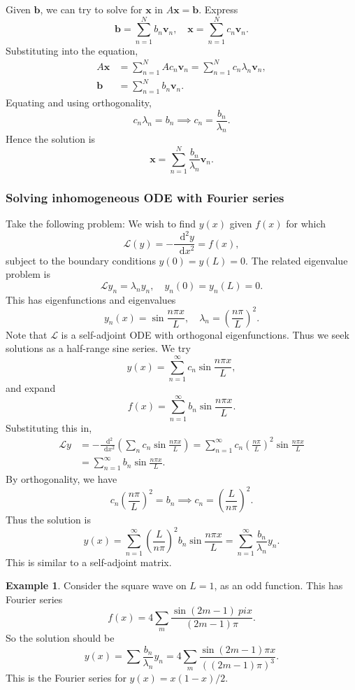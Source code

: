 \documentclass[12pt]{article}
\newcommand{\diff}{\mathop{}\!\mathrm{d}}
\newcommand{\Diff}[1]{\mathop{}\!\mathrm{d}^{#1}}
\theoremstyle{definition}
\newtheorem{example}{Example}[section]
\theoremstyle{remark}
\begin{document}
Given $\mathbf{b}$, we can try to solve for $\mathbf{x}$ in $A \mathbf{x} = \mathbf{b}$. Express 
\[
	\mathbf{b} = \sum_{n = 1}^{N} b_n \mathbf{v}_n, \quad \mathbf{x} = \sum_{n = 1}^{N} c_n \mathbf{v}_n
.\]
Substituting into the equation,
\begin{align*}
	A \mathbf{x} &= \sum_{n = 1}^{N} A c_n \mathbf{v}_n = \sum_{n = 1}^{N} c_n \lambda_n \mathbf{v}_n, \\
	\mathbf{b} &= \sum_{n = 1}^{N} b_n \mathbf{v}_n.
\end{align*}
Equating and using orthogonality,
\[
c_n \lambda_n = b_n \implies c_n = \frac{b_n}{\lambda_n}
.\]
Hence the solution is
\[
\mathbf{x} = \sum_{n = 1}^{N}\frac{b_n}{\lambda_n} \mathbf{v}_n
.\]

\subsubsection{Solving inhomogeneous ODE with Fourier series}%
\label{subsub:solving_inhomogeneous_ode_with_fourier_series}

Take the following problem: We wish to find $y(x)$ given $f(x)$ for which
\[
	\mathcal{L}(y) = - \frac{\Diff2 y}{\diff x^2} = f(x)
,\]
subject to the boundary conditions $y(0) = y(L) = 0$. The related eigenvalue problem is 
\[
	\mathcal{L}y_n = \lambda_n y_n, \quad y_n(0) = y_n(L) = 0
.\]
This has eigenfunctions and eigenvalues
\[
	y_n(x) = \sin \frac{n \pi x}{L}, \quad \lambda_n = \left( \frac{n \pi}{L} \right)^2
.\]
Note that $\mathcal{L}$ is a self-adjoint ODE with orthogonal eigenfunctions. Thus we seek solutions as a half-range sine series. We try
\[
	y(x) = \sum_{n = 1}^{\infty} c_n \sin \frac{n \pi x}{L},
\]
and expand
\[
	f(x) = \sum_{n = 1}^{\infty} b_n \sin \frac{n \pi x}{L}
.\]
Substituting this in,
\begin{align*}
	\mathcal{L}y &= - \frac{\Diff2}{\diff x^2} \left( \sum_{n} c_n \sin \frac{n \pi x}{L} \right) = \sum_{n = 1}^{\infty} c_n \left(\frac{n \pi}{L} \right)^2 \sin \frac{n \pi x}{L} \\
		     &= \sum_{n = 1}^{\infty} b_n \sin \frac{n \pi x}{L}.
\end{align*}
By orthogonality, we have
\[
	c_n \left( \frac{n \pi}{L}\right)^2 = b_n \implies c_n = \left( \frac{L}{n \pi} \right)^2
.\]
Thus the solution is
\[
	y(x) = \sum_{n = 1}^{\infty} \left( \frac{L}{n \pi}\right)^2 b_n \sin \frac{n \pi x}{L} = \sum_{n = 1}^{\infty} \frac{b_n}{\lambda_n} y_n
.\]
This is similar to a self-adjoint matrix.

\begin{adjustbox}{minipage = \columnwidth - 25.5pt, margin=1em, frame=1pt, margin=0em}
\begin{example}
	Consider the square wave on $L = 1$, as an odd function. This has Fourier series
	\[
		f(x) = 4 \sum_{m} \frac{\sin (2m - 1)\ pi x}{(2m - 1)\pi}
	.\]
	So the solution should be
	\[
		y(x) = \sum \frac{b_n}{\lambda_n} y_n = 4 \sum_{m} \frac{\sin (2m - 1)\pi x}{((2m -1)\pi)^3}
	.\]
	This is the Fourier series for $y(x) = x(1-x)/2$.
\end{example}

\end{adjustbox}



\newpage

\printindex
\end{document}
